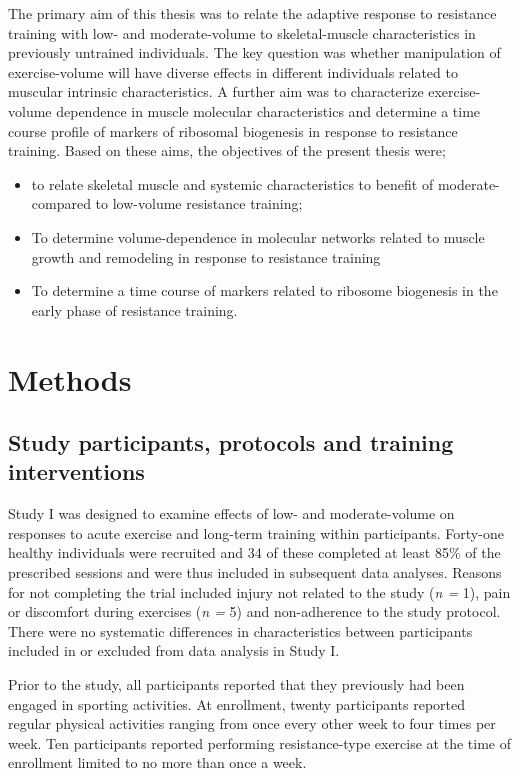 \documentclass[twoside,10pt]{gihclass} %
\providecommand{\tightlist}{%
  \setlength{\itemsep}{0pt}\setlength{\parskip}{0pt}}
\begin{document}
The primary aim of this thesis was to relate the adaptive response to resistance training with low- and moderate-volume to skeletal-muscle characteristics in previously untrained individuals. The key question was whether manipulation of exercise-volume will have diverse effects in different individuals related to muscular intrinsic characteristics. A further aim was to characterize exercise-volume dependence in muscle molecular characteristics and determine a time course profile of markers of ribosomal biogenesis in response to resistance training. Based on these aims, the objectives of the present thesis were;
\begin{itemize}
\tightlist
\item
  to relate skeletal muscle and systemic characteristics to benefit of moderate- compared to low-volume resistance training;
\item
  To determine volume-dependence in molecular networks related to muscle growth and remodeling in response to resistance training
\item
  To determine a time course of markers related to ribosome biogenesis in the early phase of resistance training.
\end{itemize}
\hypertarget{methods}{%
\chapter{Methods}\label{methods}}

\hypertarget{study-participants-protocols-and-training-interventions}{%
\section{Study participants, protocols and training interventions}\label{study-participants-protocols-and-training-interventions}}

Study I was designed to examine effects of low- and moderate-volume on
responses to acute exercise and long-term training within participants.
Forty-one healthy individuals were recruited and 34 of these completed
at least 85\% of the prescribed sessions and were thus included in
subsequent data analyses. Reasons for not completing the trial included
injury not related to the study (\emph{n =} 1), pain or discomfort during
exercises (\emph{n =} 5) and non-adherence to the study protocol. There were
no systematic differences in characteristics between participants included in or
excluded from data analysis in Study I.

Prior to the study, all participants reported that they previously had been engaged in sporting activities. At enrollment, twenty participants reported regular physical activities ranging from once every other week to four times per week. Ten participants reported performing resistance-type exercise at the time of enrollment limited to no more than once a week.
\end{document}

